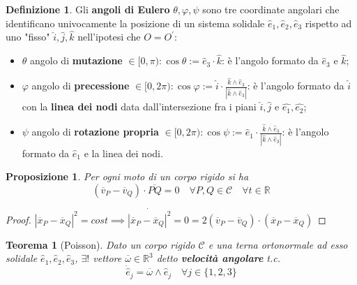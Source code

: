 \documentclass{book}
\theoremstyle{plain}
\newtheorem{teo}{Teorema}[chapter]
\theoremstyle{plain}
\theoremstyle{plain}
\theoremstyle{plain}
\theoremstyle{plain}
\newtheorem{prop}{Proposizione}[chapter]
\theoremstyle{definition}
\newtheorem{defi}{Definizione}[chapter]
\theoremstyle{remark}
\theoremstyle{definition}
\begin{document}
\begin{defi}
    Gli \textbf{angoli di Eulero} $\theta, \varphi, \psi$ sono tre coordinate angolari che identificano univocamente la posizione di un sistema solidale $\hat{e}_1, \hat{e}_2, \hat{e}_3$ rispetto ad uno "fisso" $\hat{i}, \hat{j}, \hat{k}$ nell'ipotesi che $O=O^{\prime}$:
    \begin{itemize}
        \item $\theta$ angolo di \textbf{mutazione} $\in[0, \pi): \cos \theta:=\hat{e}_{3} \cdot \hat{k}$: è l'angolo formato da $\hat{e}_{3}$ e $\hat{k}$;
        \item $\varphi$ angolo di \textbf{precessione} $\in[0,2 \pi): \cos \varphi:=\hat{i} \cdot \frac{\hat{k} \wedge \hat{e}_3}{|\hat{k} \wedge \hat{e}_3|}$: è l'angolo formato da $\hat{i}$ con la \textbf{linea dei nodi} data dall'intersezione fra i piani $\hat{i}, \hat{j}$ e $\hat{e_1}, \hat{e_2}$;
        \item $\psi$ angolo di \textbf{rotazione propria} $\in[0,2 \pi): \cos \psi:=\hat{e}_{1} \cdot \frac{\hat{k} \wedge \hat{e}_{3}}{|\hat{k} \wedge \hat{e}_{3}|}$: è l'angolo formato da $\hat{e}_1$ e la linea dei nodi.
    \end{itemize}
\end{defi}

\begin{prop}
     Per ogni moto di un corpo rigido si ha
    \begin{displaymath}
    \boxed{
        (\overline{v}_{P}-\overline{v}_{Q}) \cdot \overline{PQ}=0 \quad \forall P, Q \in \mathcal{C} \quad \forall t \in \mathbb{R}
        }
    \end{displaymath}
\end{prop}

\begin{proof}
    $|\overline{x}_P-\overline{x}_Q|^2= cost \implies\Dot{|\overline{x}_P-\overline{x}_Q|^2}=0=2(\overline{v}_P-\overline{v}_Q)\cdot(\overline{x}_P-\overline{x}_Q)$
\end{proof}

\begin{teo}[Poisson]
    Dato un corpo rigido $\mathcal{C}$ e una terna ortonormale ad esso solidale $\hat{e}_1, \hat{e}_2, \hat{e}_3$, $\exists!$ vettore $\overline{\omega} \in \mathbb{R}^{3}$ detto \textbf{velocità angolare} t.c.
    \begin{displaymath}
    \boxed{
        \dot{\hat{e}}_{j}=\overline{\omega} \wedge \hat{e}_{j} \quad \forall j \in\{1,2,3\}
        }
    \end{displaymath}
\end{teo}
\end{document}
